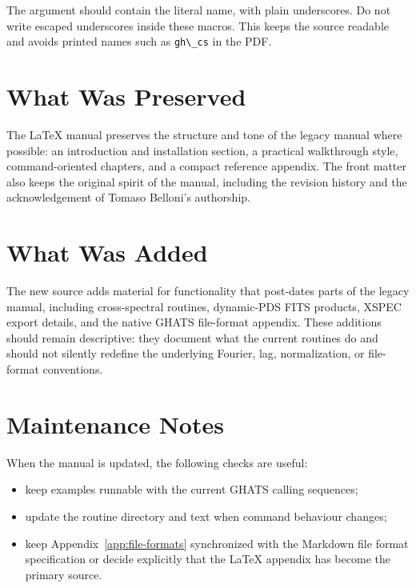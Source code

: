 The argument should contain the literal name, with plain underscores.  Do not
write escaped underscores inside these macros.  This keeps the source readable
and avoids printed names such as \texttt{gh\textbackslash\_cs} in the PDF.

\section{What Was Preserved}

The LaTeX manual preserves the structure and tone of the legacy manual where
possible: an introduction and installation section, a practical walkthrough
style, command-oriented chapters, and a compact reference appendix.  The
front matter also keeps the original spirit of the manual, including the
revision history and the acknowledgement of Tomaso Belloni's authorship.

\section{What Was Added}

The new source adds material for functionality that post-dates parts of the
legacy manual, including cross-spectral routines, dynamic-PDS FITS products,
XSPEC export details, and the native GHATS file-format appendix.  These
additions should remain descriptive: they document what the current routines do
and should not silently redefine the underlying Fourier, lag, normalization, or
file-format conventions.

\section{Maintenance Notes}

When the manual is updated, the following checks are useful:

\begin{itemize}
\item keep examples runnable with the current GHATS calling sequences;
\item update the routine directory and  text when command
      behaviour changes;
\item keep Appendix~\ref{app:file-formats} synchronized with the Markdown file
      format specification or decide explicitly that the LaTeX appendix has
      become the primary source.
\end{itemize}
